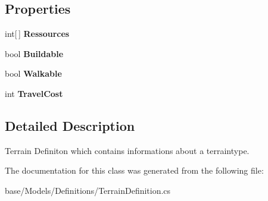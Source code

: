 \subsection*{Properties}
\begin{DoxyCompactItemize}
\item 
\hypertarget{classCore_1_1Models_1_1Definitions_1_1TerrainDefinition_a76ea185d6849c0806fb69826f6ecd5e5}{int\mbox{[}$\,$\mbox{]} {\bfseries Ressources}}\label{classCore_1_1Models_1_1Definitions_1_1TerrainDefinition_a76ea185d6849c0806fb69826f6ecd5e5}

\item 
\hypertarget{classCore_1_1Models_1_1Definitions_1_1TerrainDefinition_a7ea92cea864ec5076938847f78ecb186}{bool {\bfseries Buildable}}\label{classCore_1_1Models_1_1Definitions_1_1TerrainDefinition_a7ea92cea864ec5076938847f78ecb186}

\item 
\hypertarget{classCore_1_1Models_1_1Definitions_1_1TerrainDefinition_a6811c8cb478e3c2cbbab24fbbd746e16}{bool {\bfseries Walkable}}\label{classCore_1_1Models_1_1Definitions_1_1TerrainDefinition_a6811c8cb478e3c2cbbab24fbbd746e16}

\item 
\hypertarget{classCore_1_1Models_1_1Definitions_1_1TerrainDefinition_aa1f619459353eedfb36c657b0eb370e7}{int {\bfseries Travel\-Cost}}\label{classCore_1_1Models_1_1Definitions_1_1TerrainDefinition_aa1f619459353eedfb36c657b0eb370e7}

\end{DoxyCompactItemize}


\subsection{Detailed Description}
Terrain Definiton which contains informations about a terraintype. 



The documentation for this class was generated from the following file\-:\begin{DoxyCompactItemize}
\item 
base/\-Models/\-Definitions/Terrain\-Definition.\-cs\end{DoxyCompactItemize}
